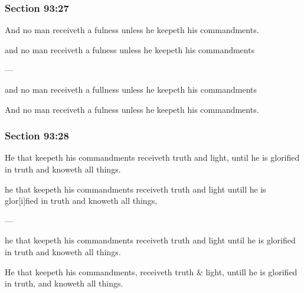 	\subsubsection{Section 93:27} %
		\label{DC93-27}

		And no man receiveth a fulness unless he keepeth his commandments.

		\begin{framed}
		\scriptsize
			\begin{compactdesc}
				\item[JSP] and no man receiveth a fulness unless he keepeth his commandments
				\item[BC] ---
				\item[RB2] and no man receiveth a fullness unless he keepeth his commandments 
				\item[RB1] And no man receiveth a fulness unless he keepeth his commandments. 
			\end{compactdesc}
		\end{framed}

	\subsubsection{Section 93:28} %
		\label{DC93-28}

		He that keepeth his commandments receiveth truth and light, until he is glorified in truth and knoweth all things.

		\begin{framed}
		\scriptsize
			\begin{compactdesc}
				\item[JSP] he that keepeth his commandments receiveth truth and light untill he is glor[i]fied in truth and knoweth all things,
				\item[BC] ---
				\item[RB2] he that keepeth his commandments receiveth truth and light until he is glorified in truth and knoweth all things. 
				\item[RB1] He that keepeth his commandments, receiveth truth \& light, untill he is glorified in truth, and knoweth all things. 
			\end{compactdesc}
		\end{framed}

